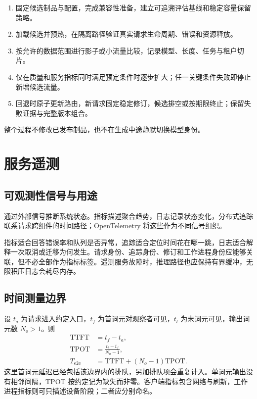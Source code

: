 \documentclass[../textbook.tex]{subfiles}
\begin{document}
\begin{algorithm}[候选服务修订的晋级]
\begin{enumerate}
\item 固定候选制品与配置，完成兼容性准备，建立可追溯评估基线和稳定容量保留策略。
\item 加载候选并预热，在隔离路径验证真实请求生命周期、错误和资源释放。
\item 按允许的数据范围进行影子或小流量比较，记录模型、长度、任务与租户切片。
\item 仅在质量和服务指标同时满足预定条件时逐步扩大；任一关键条件失败即停止新增候选流量。
\item 回退时原子更新路由，新请求固定稳定修订，候选排空或按期限终止；保留失败证据与完整版本组合。
\end{enumerate}
整个过程不修改已发布制品，也不在生成中途静默切换模型身份。
\end{algorithm}

\section{服务遥测}

\subsection{可观测性信号与用途}
通过外部信号推断系统状态。指标描述聚合趋势，日志记录状态变化，分布式追踪联系请求跨组件的时间路径；OpenTelemetry 将这些作为不同信号组织\cite{opentelemetry2026signals}。

指标适合回答错误率和队列是否异常，追踪适合定位时间花在哪一跳，日志适合解释一次取消或迁移为何发生。请求身份、追踪身份、修订和工作进程身份应能够关联，但不必全部作为指标标签。遥测服务故障时，推理路径也应保持有界缓冲，无限积压日志会耗尽内存。

\subsection{时间测量边界}
设 $t_a$ 为请求进入约定入口，$t_f$ 为首词元对观察者可见，$t_l$ 为末词元可见，输出词元数 $N_o>1$。则
\begin{equation}
 \begin{aligned}
  \mathrm{TTFT}&=t_f-t_a,\\
  \mathrm{TPOT}&=\frac{t_l-t_f}{N_o-1},\\
  T_{\mathrm{e2e}}&=\mathrm{TTFT}+(N_o-1)\mathrm{TPOT}.
 \end{aligned}
\end{equation}
这里首词元延迟已经包括该边界内的排队，另加排队项会重复计入。单词元输出没有相邻间隔，TPOT 按约定记为缺失而非零。客户端指标包含网络与刷新，工作进程指标则可只描述设备阶段；二者应分别命名。
\end{document}
